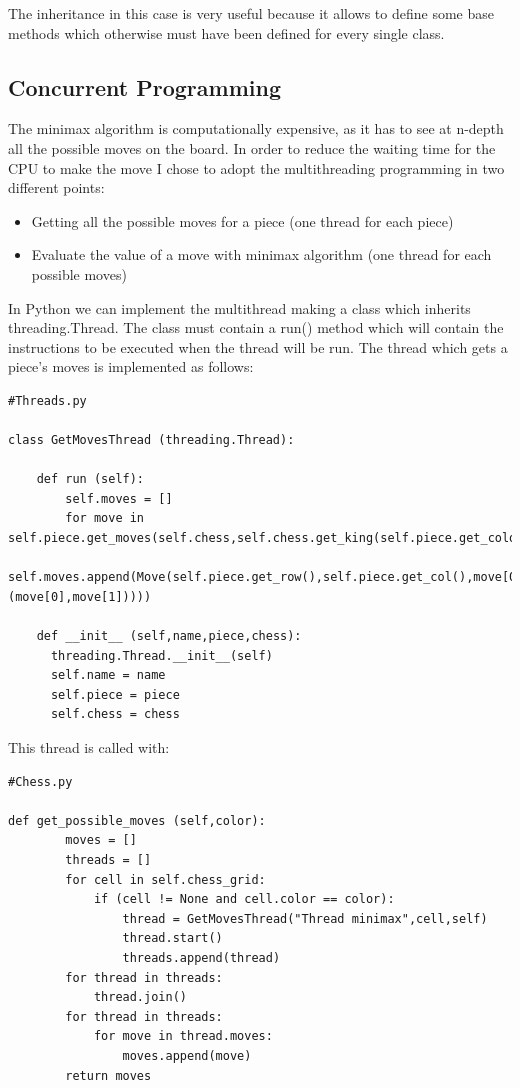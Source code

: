 \documentclass[english]{article}
\begin{document}
The inheritance in this case is very useful because it allows to define some base methods which otherwise must have been defined for every single class. 

\subsection{Concurrent Programming}
The minimax algorithm is computationally expensive, as it has to see at n-depth all the possible moves on the board.
In order to reduce the waiting time for the CPU to make the move I chose to adopt the multithreading programming in two different points:
\begin{itemize}
	\item Getting all the possible moves for a piece (one thread for each piece)
	\item Evaluate the value of a move with minimax algorithm (one thread for each possible moves)
\end{itemize}

In Python we can implement the multithread making a class which inherits threading.Thread.
The class must contain a run() method which will contain the instructions to be executed when the thread will be run.
The thread which gets a piece's moves is implemented as follows:

\begin{lstlisting}
#Threads.py

class GetMovesThread (threading.Thread):

    def run (self):
        self.moves = []
        for move in self.piece.get_moves(self.chess,self.chess.get_king(self.piece.get_color())):
            self.moves.append(Move(self.piece.get_row(),self.piece.get_col(),move[0],move[1],self.chess.move_eval((self.piece.get_row(),self.piece.get_col()),(move[0],move[1]))))

    def __init__ (self,name,piece,chess):
      threading.Thread.__init__(self)
      self.name = name
      self.piece = piece
      self.chess = chess

\end{lstlisting}

This thread is called with:

\begin{lstlisting}
#Chess.py

def get_possible_moves (self,color):
        moves = []
        threads = []
        for cell in self.chess_grid:
            if (cell != None and cell.color == color):
                thread = GetMovesThread("Thread minimax",cell,self)
                thread.start()
                threads.append(thread)
        for thread in threads:
            thread.join()
        for thread in threads:
            for move in thread.moves:
                moves.append(move)
        return moves

\end{lstlisting}
\end{document}
